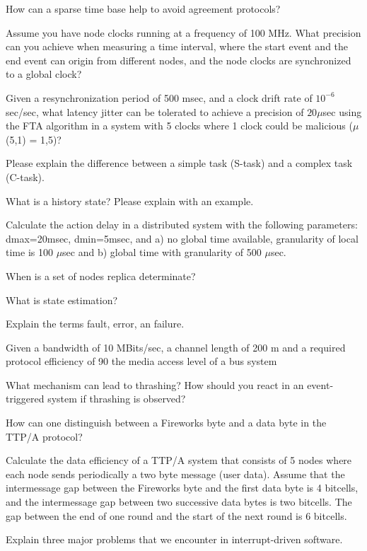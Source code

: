 
How can a sparse time base help to avoid agreement protocols?



Assume you have node clocks running at a frequency of 100 MHz. What precision can you
achieve when measuring a time interval, where the start event and the end event can origin
from different nodes, and the node clocks are synchronized to a global clock?


Given a resynchronization period of 500 msec, and a clock drift rate of $10^{-6}$ sec/sec, what
latency jitter can be tolerated to achieve a precision of $20\mu$sec using the FTA algorithm in a
system with 5 clocks where 1 clock could be malicious ($\mu$(5,1) = 1,5)?



Please explain the difference between a simple task (S-task) and a complex task (C-task).
\pagebreak



 What is a history state? Please explain with an example.


Calculate the action delay in a distributed system with the following parameters:
dmax=20msec, dmin=5msec,
and a) no global time available, granularity of local time is 100 $\mu$sec
and b) global time with granularity of 500 $\mu$sec.

\pagebreak


When is a set of nodes replica determinate?



What is state estimation?


Explain the terms fault, error, an failure.


Given a bandwidth of 10 MBits/sec, a channel length of 200 m and a required protocol
efficiency of 90%
the media access level of a bus system



What mechanism can lead to thrashing? How should you react in an event-triggered system
if thrashing is observed?



How can one distinguish between a Fireworks byte and a data byte in the TTP/A protocol?


 Calculate the data efficiency of a TTP/A system that consists of 5 nodes where each node
sends periodically a two byte message (user data). Assume that the intermessage gap
between the Fireworks byte and the first data byte is 4 bitcells, and the intermessage gap
between two successive data bytes is two bitcells. The gap between the end of one round
and the start of the next round is 6 bitcells.


Explain three major problems that we encounter in interrupt-driven software.

